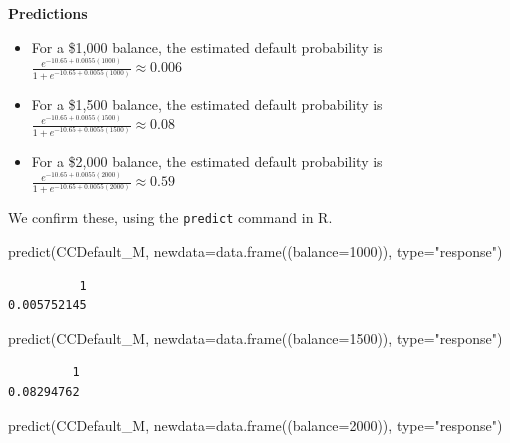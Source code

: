 \documentclass[
  letterpaper,
  DIV=11,
  numbers=noendperiod]{scrreprt}
\newenvironment{Shaded}{\begin{snugshade}}{\end{snugshade}}
\newcommand{\AttributeTok}[1]{\textcolor[rgb]{0.40,0.45,0.13}{#1}}
\newcommand{\DecValTok}[1]{\textcolor[rgb]{0.68,0.00,0.00}{#1}}
\newcommand{\FunctionTok}[1]{\textcolor[rgb]{0.28,0.35,0.67}{#1}}
\newcommand{\NormalTok}[1]{\textcolor[rgb]{0.00,0.23,0.31}{#1}}
\newcommand{\StringTok}[1]{\textcolor[rgb]{0.13,0.47,0.30}{#1}}
\begin{document}
\textbf{Predictions}

\begin{itemize}
\item
  For a \$1,000 balance, the estimated default probability is
  \(\frac{e^{-10.65+0.0055(1000) }}{1+e^{-10.65+0.0055(1000)}} \approx 0.006\)
\item
  For a \$1,500 balance, the estimated default probability is
  \(\frac{e^{-10.65+0.0055(1500) }}{1+e^{-10.65+0.0055(1500)}} \approx 0.08\)
\item
  For a \$2,000 balance, the estimated default probability is
  \(\frac{e^{-10.65+0.0055(2000) }}{1+e^{-10.65+0.0055(2000)}} \approx 0.59\)
\end{itemize}

We confirm these, using the \texttt{predict} command in R.

\begin{Shaded}
\begin{Highlighting}[]
\FunctionTok{predict}\NormalTok{(CCDefault\_M, }\AttributeTok{newdata=}\FunctionTok{data.frame}\NormalTok{((}\AttributeTok{balance=}\DecValTok{1000}\NormalTok{)), }\AttributeTok{type=}\StringTok{"response"}\NormalTok{)}
\end{Highlighting}
\end{Shaded}

\begin{verbatim}
          1 
0.005752145 
\end{verbatim}

\begin{Shaded}
\begin{Highlighting}[]
\FunctionTok{predict}\NormalTok{(CCDefault\_M, }\AttributeTok{newdata=}\FunctionTok{data.frame}\NormalTok{((}\AttributeTok{balance=}\DecValTok{1500}\NormalTok{)), }\AttributeTok{type=}\StringTok{"response"}\NormalTok{)}
\end{Highlighting}
\end{Shaded}

\begin{verbatim}
         1 
0.08294762 
\end{verbatim}

\begin{Shaded}
\begin{Highlighting}[]
\FunctionTok{predict}\NormalTok{(CCDefault\_M, }\AttributeTok{newdata=}\FunctionTok{data.frame}\NormalTok{((}\AttributeTok{balance=}\DecValTok{2000}\NormalTok{)), }\AttributeTok{type=}\StringTok{"response"}\NormalTok{)}
\end{Highlighting}
\end{Shaded}
\end{document}
